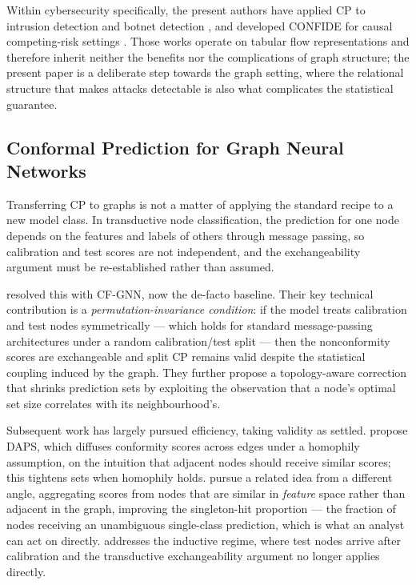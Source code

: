 Within cybersecurity specifically, the present authors have applied CP to
intrusion detection \citep{dang23ids} and botnet detection
\citep{dang24botnet}, and developed CONFIDE for causal competing-risk settings
\citep{dang26confide}. Those works operate on tabular flow representations and
therefore inherit neither the benefits nor the complications of graph structure;
the present paper is a deliberate step towards the graph setting, where the
relational structure that makes attacks detectable is also what complicates the
statistical guarantee.

\subsection{Conformal Prediction for Graph Neural Networks}

Transferring CP to graphs is not a matter of applying the standard recipe to a
new model class. In transductive node classification, the prediction for one
node depends on the features and labels of others through message passing, so
calibration and test scores are not independent, and the exchangeability
argument must be re-established rather than assumed.

\citet{cfgnn} resolved this with CF-GNN, now the de-facto baseline. Their key
technical contribution is a \emph{permutation-invariance condition}: if the
model treats calibration and test nodes symmetrically — which holds for standard
message-passing architectures under a random calibration/test split — then the
nonconformity scores are exchangeable and split CP remains valid despite the
statistical coupling induced by the graph. They further propose a topology-aware
correction that shrinks prediction sets by exploiting the observation that a
node's optimal set size correlates with its neighbourhood's.

Subsequent work has largely pursued efficiency, taking validity as settled.
\citet{daps} propose DAPS, which diffuses conformity scores across edges under a
homophily assumption, on the intuition that adjacent nodes should receive
similar scores; this tightens sets when homophily holds. \citet{snaps} pursue a
related idea from a different angle, aggregating scores from nodes that are
similar in \emph{feature} space rather than adjacent in the graph, improving the
singleton-hit proportion — the fraction of nodes receiving an unambiguous
single-class prediction, which is what an analyst can act on directly.
\citet{clarkson23} addresses the inductive regime, where test nodes arrive after
calibration and the transductive exchangeability argument no longer applies
directly.

